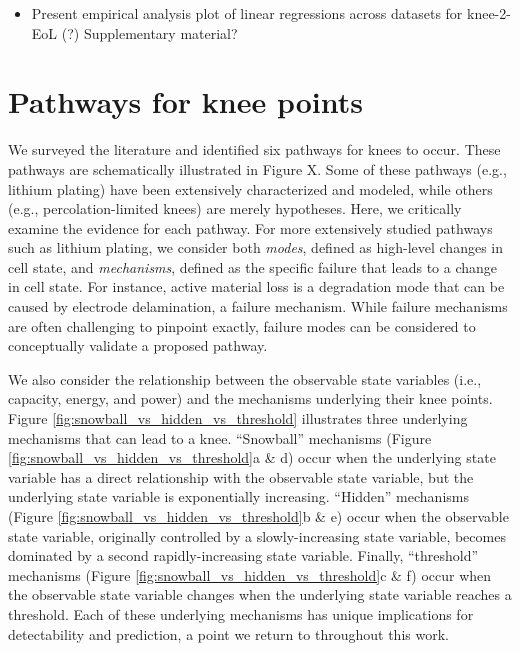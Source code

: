 \documentclass{article}
\begin{document}
{\begin{itemize}
    These methods we implemented, and (empirically) tested in database of \cite{severson_data-driven_2019}. Noteworthy of remark is that the Kneedle's knee was always ahead of the Bacon Watts knee. In view of the a linear regression analysis between knee-point to EOL, 
    
    \item Present empirical analysis plot of linear regressions across datasets for knee-2-EoL (?) Supplementary material?
    \end{itemize}
}




\section{Pathways for knee points}

We surveyed the literature and identified six pathways for knees to occur. These pathways are schematically illustrated in Figure X. Some of these pathways (e.g., lithium plating) have been extensively characterized and modeled, while others (e.g., percolation-limited knees) are merely hypotheses. Here, we critically examine the evidence for each pathway. For more extensively studied pathways such as lithium plating, we consider both \textit{modes}, defined as high-level changes in cell state, and \textit{mechanisms}, defined as the specific failure that leads to a change in cell state. For instance, active material loss is a degradation mode that can be caused by electrode delamination, a failure mechanism. While failure mechanisms are often challenging to pinpoint exactly, failure modes can be considered to conceptually validate a proposed pathway.

We also consider the relationship between the observable state variables (i.e., capacity, energy, and power) and the mechanisms underlying their knee points. Figure \ref{fig:snowball_vs_hidden_vs_threshold} illustrates three underlying mechanisms that can lead to a knee. ``Snowball'' mechanisms (Figure \ref{fig:snowball_vs_hidden_vs_threshold}a \& d) occur when the underlying state variable has a direct relationship with the observable state variable, but the underlying state variable is exponentially increasing. ``Hidden'' mechanisms (Figure \ref{fig:snowball_vs_hidden_vs_threshold}b \& e) occur when the observable state variable, originally controlled by a slowly-increasing state variable, becomes dominated by a second rapidly-increasing state variable. Finally, ``threshold'' mechanisms (Figure \ref{fig:snowball_vs_hidden_vs_threshold}c \& f) occur when the observable state variable changes when the underlying state variable reaches a threshold. Each of these underlying mechanisms has unique implications for detectability and prediction, a point we return to throughout this work.
\end{document}
